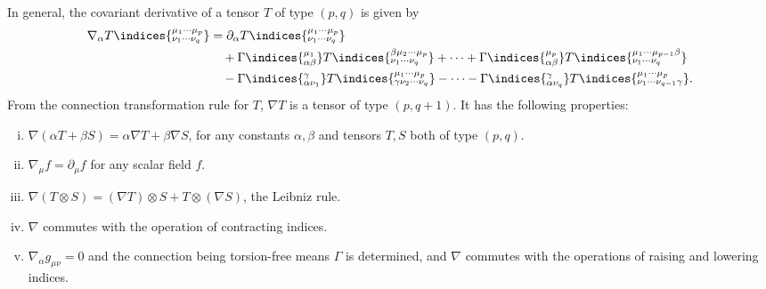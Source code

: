 \documentclass[12pt]{article}
\begin{document}
In general, the covariant derivative of a tensor $T$ of type $(p, q)$ is given by
\begin{align*}
	\nabla_\alpha T\indices{^{\mu_1\cdots\mu_p}_{\nu_1\cdots\nu_q}} &= \partial_\alpha T\indices{^{\mu_1 \cdots \mu_p}_{\nu_1 \cdots \nu_q}} \\
									& \quad + \Gamma\indices{^{\mu_1}_{\alpha\beta}} T\indices{^{\beta\mu_2\cdots\mu_p}_{\nu_1\cdots\nu_q}} + \cdots + \Gamma\indices{^{\mu_p}_{\alpha\beta}} T\indices{^{\mu_1\cdots\mu_{p-1}\beta}_{\nu_1\cdots\nu_q}} \\
									& \quad - \Gamma\indices{^\gamma_{\alpha\nu_1}} T\indices{^{\mu_1\cdots\mu_p}_{\gamma\nu_2\cdots\nu_q}} - \cdots - \Gamma\indices{^\gamma_{\alpha\nu_q}} T\indices{^{\mu_1\cdots\mu_p}_{\nu_1\cdots\nu_{q-1}\gamma}}.
\end{align*}
From the connection transformation rule for $T$, $\nabla T$ is a tensor of type $(p, q+1)$. It has the following properties:
\begin{enumerate}[(i)]
	\item $\nabla(\alpha T + \beta S) = \alpha \nabla T + \beta \nabla S$, for any constants $\alpha, \beta$ and tensors $T, S$ both of type $(p, q)$.
	\item $\nabla_\mu f = \partial_\mu f$ for any scalar field $f$.
	\item $\nabla(T \otimes S) = (\nabla T) \otimes S + T \otimes (\nabla S)$, the Leibniz rule.
	\item $\nabla$ commutes with the operation of contracting indices.
	\item $\nabla_\alpha g_{\mu\nu} = 0$ and the connection being torsion-free means $\Gamma$ is determined, and $\nabla$ commutes with the operations of raising and lowering indices.
\end{enumerate}
\end{document}
